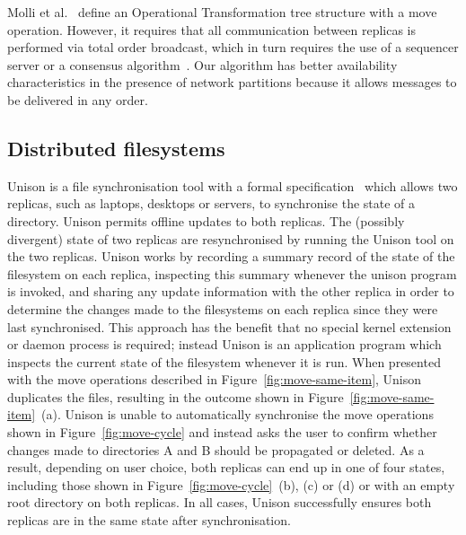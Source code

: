\documentclass[sigconf]{acmart}
\begin{document}
Molli et al.~\cite{Molli:2003cd} define an Operational Transformation tree structure with a move operation.
However, it requires that all communication between replicas is performed via total order broadcast, which in turn requires the use of a sequencer server or a consensus algorithm~\cite{Chandra:1996cp}.
Our algorithm has better availability characteristics in the presence of network partitions because it allows messages to be delivered in any order.

\subsection{Distributed filesystems}\label{sec:filesystems}

Unison is a file synchronisation tool with a formal specification~\cite{PierceVouillon:UnisonSpecTR} which allows two replicas, such as laptops, desktops or servers, to synchronise the state of a directory. 
Unison permits offline updates to both replicas. 
The (possibly divergent) state of two replicas are resynchronised by running the Unison tool on the two replicas. 
Unison works by recording a summary record of the state of the filesystem on each replica,  inspecting this summary whenever the unison program is invoked, and sharing any update information with the other replica in order to determine the changes made to the filesystems on each replica since they were last synchronised. 
This approach has the benefit that no special kernel extension or daemon process is required; instead Unison is an application program which inspects the current state of the filesystem whenever it is run. 
When presented with the move operations described in Figure~\ref{fig:move-same-item}, Unison duplicates the files, resulting in the outcome shown in Figure~\ref{fig:move-same-item}~(a). 
Unison is unable to automatically synchronise the move operations shown in Figure~\ref{fig:move-cycle} and instead asks the user to confirm whether changes made to directories A and B should be propagated or deleted. 
As a result, depending on user choice, both replicas can end up in one of four states, including those shown in Figure~\ref{fig:move-cycle}~(b), (c) or (d) or with an empty root directory on both replicas. 
In all cases, Unison successfully ensures both replicas are in the same state after synchronisation.
\end{document}
